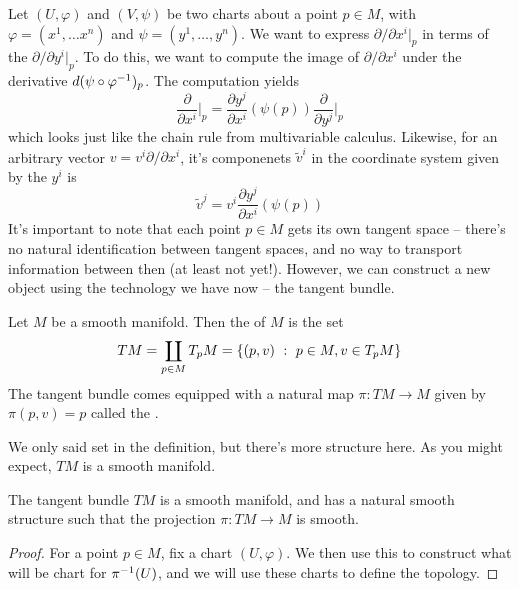 Let $(U, \varphi)$ and $(V, \psi)$ be two charts about a point $p \in M$, with
$\varphi = (x^1, \ldots x^n)$ and $\psi = (y^1, \ldots, y^n)$.
We want to express $\partial/\partial x^i\vert_p$ in terms of the
$\partial/\partial y^i\vert_p$. To do this, we want to compute the image of
$\partial / \partial x^i$ under the derivative $d(\psi \circ \varphi^{-1})_p$.
The computation yields
$$\frac{\partial}{\partial x^i}\bigg\vert_p =
\frac{\partial y^j}{\partial x^i}(\psi(p)) \frac{\partial}{\partial y^j}\bigg\vert_p$$
which looks just like the chain rule from multivariable calculus. Likewise,
for an arbitrary vector $v = v^i \partial / \partial x^i$, it's componenets
$\tilde{v}^i$ in the coordinate system given by the $y^i$ is
$$\tilde{v}^j = v^i\frac{\partial y^j}{\partial x^i}(\psi(p)) $$
%
It's important to note that each point $p \in M$ gets its own tangent
space -- there's no natural identification between tangent spaces, and
no way to transport information between then (at least not yet!).
However, we can construct a new object using the technology we have
now -- the tangent bundle.
\begin{defn}
	Let $M$ be a smooth manifold. Then the  of $M$ is
	the set
	$$TM = \coprod_{p \in M} T_pM = \left\lbrace (p,v) ~:~ p \in M, v \in T_pM \right\rbrace $$
	The tangent bundle comes equipped with a natural map $\pi : TM \to M$
	given by $\pi(p,v) = p$ called the .
\end{defn}
%
We only said set in the definition, but there's more structure here. As
you might expect, $TM$ is a smooth manifold.
%
\begin{thm}
	The tangent bundle $TM$ is a smooth manifold, and has a natural smooth
	structure such that the projection $\pi : TM \to M$ is smooth.
\end{thm}
%
\begin{proof}
For a point $p \in M$, fix a chart $(U, \varphi)$. We then use this to
construct what will be chart for $\pi^{-1}(U)$, and we will use these
charts to define the topology.
\end{proof}
